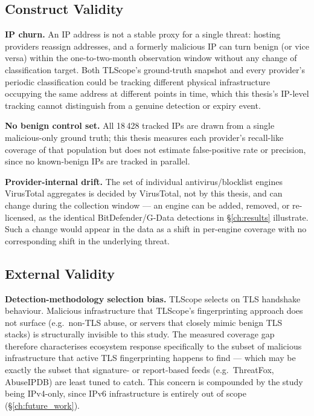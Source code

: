 \documentclass[12pt, a4paper, twoside]{report}
\begin{document}
\subsection{Construct Validity}

\textbf{IP churn.} An IP address is not a stable proxy for a single threat: hosting providers
reassign addresses, and a formerly malicious IP can turn benign (or vice versa) within the
one-to-two-month observation window without any change of classification target. Both TLScope's
ground-truth snapshot and every provider's periodic classification could be tracking different
physical infrastructure occupying the same address at different points in time, which this thesis's
IP-level tracking cannot distinguish from a genuine detection or expiry event.

\textbf{No benign control set.} All 18\,428 tracked IPs are drawn from a single malicious-only
ground truth; this thesis measures each provider's recall-like coverage of that population but does
not estimate false-positive rate or precision, since no known-benign IPs are tracked in parallel.

\textbf{Provider-internal drift.} The set of individual antivirus/blocklist engines VirusTotal
aggregates is decided by VirusTotal, not by this thesis, and can change during the collection
window --- an engine can be added, removed, or re-licensed, as the identical BitDefender/G-Data
detections in \S\ref{ch:results} illustrate. Such a change would appear in the data as a shift in
per-engine coverage with no corresponding shift in the underlying threat.

\subsection{External Validity}

\textbf{Detection-methodology selection bias.} TLScope selects on TLS handshake behaviour. Malicious
infrastructure that TLScope's fingerprinting approach does not surface (e.g.\ non-TLS abuse, or
servers that closely mimic benign TLS stacks) is structurally invisible to this study. The measured
coverage gap therefore characterises ecosystem response specifically to the subset of malicious
infrastructure that active TLS fingerprinting happens to find --- which may be exactly the subset
that signature- or report-based feeds (e.g.\ ThreatFox, AbuseIPDB) are least tuned to catch. This
concern is compounded by the study being IPv4-only, since IPv6 infrastructure is entirely out of
scope (\S\ref{ch:future_work}).
\end{document}
